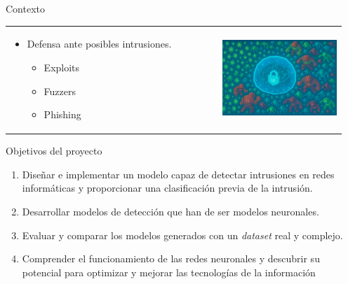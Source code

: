 \begin{frame}{Contexto}
\begin{tabular}{ >{\raggedright\arraybackslash}m{0.6\linewidth} >{\centering\arraybackslash}m{0.35\linewidth} }
    \begin{itemize}
      \item Defensa ante posibles intrusiones.
      \begin{itemize}
      	\item Exploits
      	\item Fuzzers
      	\item Phishing
      \end{itemize}
    \end{itemize} &
    \includegraphics[width=\linewidth]{./img/atacados.png} \\
  \end{tabular}
\end{frame}


\begin{frame}{Objetivos del proyecto}
    \begin{enumerate}
        \item  Diseñar e implementar un modelo capaz de detectar intrusiones en redes informáticas y proporcionar una clasificación previa de la intrusión.
        \vspace{10mm}
        \item Desarrollar modelos de detección que han de ser modelos neuronales.
        \vspace{10mm}
        \item Evaluar y comparar los modelos generados con un \textit{dataset} real y complejo.
        \vspace{10mm}
        \color{granate}
        \item Comprender el funcionamiento de las redes neuronales y descubrir su potencial para optimizar y mejorar las tecnologías de la información
    \end{enumerate}
\end{frame}

